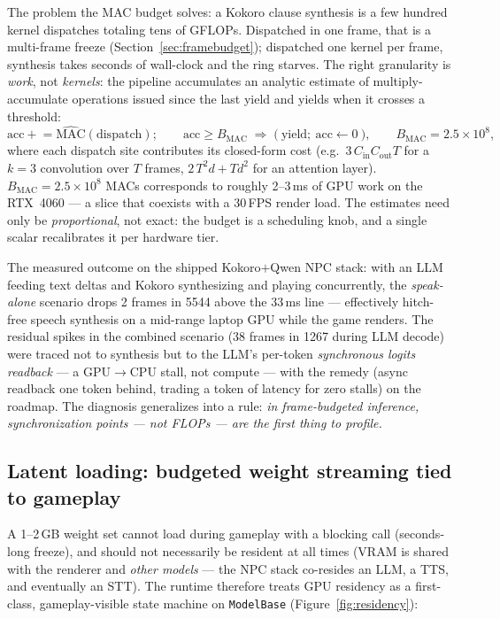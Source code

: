 \documentclass[11pt,a4paper]{article}
\newcommand{\code}[1]{\texttt{#1}}
\begin{document}
The problem the MAC budget solves: a Kokoro clause synthesis is a few hundred kernel
dispatches totaling tens of GFLOPs. Dispatched in one frame, that is a multi-frame
freeze (Section~\ref{sec:framebudget}); dispatched one kernel per frame, synthesis takes
seconds of wall-clock and the ring starves. The right granularity is \emph{work},
not \emph{kernels}: the pipeline accumulates an analytic estimate of multiply-accumulate
operations issued since the last yield and yields when it crosses a threshold:
\begin{equation}
\mathrm{acc} \mathrel{+}= \widehat{\mathrm{MAC}}(\mathrm{dispatch});
\qquad
\mathrm{acc} \ge B_{\mathrm{MAC}} \;\Rightarrow\; \big(\ \mathrm{yield};\
\mathrm{acc} \leftarrow 0\ \big),
\qquad B_{\mathrm{MAC}} = 2.5\times 10^{8},
\label{eq:macslice}
\end{equation}
where each dispatch site contributes its closed-form cost (e.g.\ $3\,C_{\mathrm{in}}
C_{\mathrm{out}} T$ for a $k{=}3$ convolution over $T$ frames, $2\,T^2 d + T d^2$ for an
attention layer). $B_{\mathrm{MAC}} = 2.5\times10^8$ MACs corresponds to roughly
2--3\,ms of GPU work on the RTX~4060 --- a slice that coexists with a 30\,FPS render
load. The estimates need only be \emph{proportional}, not exact: the budget is a
scheduling knob, and a single scalar recalibrates it per hardware tier.

The measured outcome on the shipped Kokoro$+$Qwen NPC stack: with an LLM feeding text
deltas and Kokoro synthesizing and playing concurrently, the \emph{speak-alone}
scenario drops 2 frames in 5544 above the 33\,ms line --- effectively hitch-free
speech synthesis on a mid-range laptop GPU while the game renders. The residual spikes
in the combined scenario (38 frames in 1267 during LLM decode) were traced not to
synthesis but to the LLM's per-token \emph{synchronous logits readback} --- a
GPU$\to$CPU stall, not compute --- with the remedy (async readback one token behind,
trading a token of latency for zero stalls) on the roadmap. The
diagnosis generalizes into a rule: \emph{in frame-budgeted inference, synchronization
points --- not FLOPs --- are the first thing to profile.}

\subsection{Latent loading: budgeted weight streaming tied to gameplay}
\label{sec:latent}

A 1--2\,GB weight set cannot load during gameplay with a blocking call (seconds-long
freeze), and should not necessarily be resident at all times (VRAM is shared with the
renderer and \emph{other models} --- the NPC stack co-resides an LLM, a TTS, and
eventually an STT). The runtime therefore treats GPU residency as a first-class,
gameplay-visible state machine on \code{ModelBase}
(Figure~\ref{fig:residency}):
\end{document}

